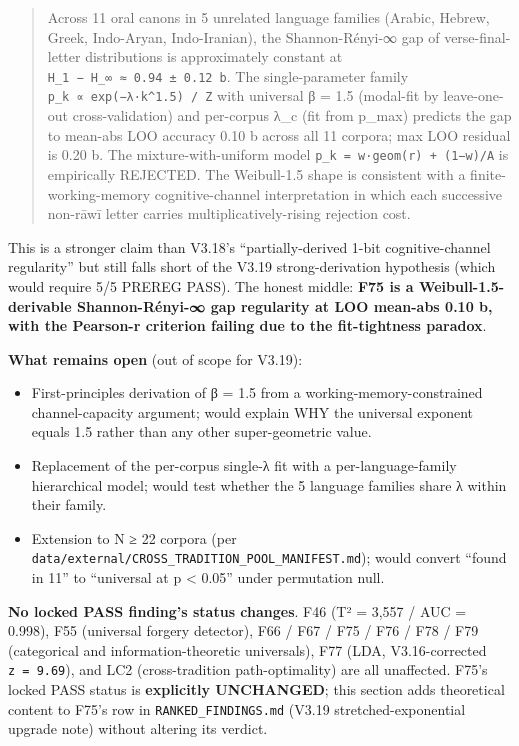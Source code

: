 \documentclass[
]{article}
\providecommand{\tightlist}{%
  \setlength{\itemsep}{0pt}\setlength{\parskip}{0pt}}
\begin{document}
\begin{quote}
Across 11 oral canons in 5 unrelated language families (Arabic, Hebrew,
Greek, Indo-Aryan, Indo-Iranian), the Shannon-Rényi-∞ gap of
verse-final-letter distributions is approximately constant at
\texttt{H\_1\ −\ H\_∞\ ≈\ 0.94\ ±\ 0.12\ b}. The single-parameter family
\texttt{p\_k\ ∝\ exp(−λ·k\^{}1.5)\ /\ Z} with universal β = 1.5
(modal-fit by leave-one-out cross-validation) and per-corpus λ\_c (fit
from p\_max) predicts the gap to mean-abs LOO accuracy 0.10 b across all
11 corpora; max LOO residual is 0.20 b. The mixture-with-uniform model
\texttt{p\_k\ =\ w·geom(r)\ +\ (1−w)/A} is empirically REJECTED. The
Weibull-1.5 shape is consistent with a finite-working-memory
cognitive-channel interpretation in which each successive non-rāwī
letter carries multiplicatively-rising rejection cost.
\end{quote}

This is a stronger claim than V3.18's ``partially-derived 1-bit
cognitive-channel regularity'' but still falls short of the V3.19
strong-derivation hypothesis (which would require 5/5 PREREG PASS). The
honest middle: \textbf{F75 is a Weibull-1.5-derivable Shannon-Rényi-∞
gap regularity at LOO mean-abs 0.10 b, with the Pearson-r criterion
failing due to the fit-tightness paradox}.

\textbf{What remains open} (out of scope for V3.19):

\begin{itemize}
\tightlist
\item
  First-principles derivation of β = 1.5 from a
  working-memory-constrained channel-capacity argument; would explain
  WHY the universal exponent equals 1.5 rather than any other
  super-geometric value.
\item
  Replacement of the per-corpus single-λ fit with a per-language-family
  hierarchical model; would test whether the 5 language families share λ
  within their family.
\item
  Extension to N ≥ 22 corpora (per
  \texttt{data/external/CROSS\_TRADITION\_POOL\_MANIFEST.md}); would
  convert ``found in 11'' to ``universal at p \textless{} 0.05'' under
  permutation null.
\end{itemize}

\textbf{No locked PASS finding's status changes}. F46 (T² = 3,557 / AUC
= 0.998), F55 (universal forgery detector), F66 / F67 / F75 / F76 / F78
/ F79 (categorical and information-theoretic universals), F77 (LDA,
V3.16-corrected \texttt{\textbar{}z\textbar{}\ =\ 9.69}), and LC2
(cross-tradition path-optimality) are all unaffected. F75's locked PASS
status is \textbf{explicitly UNCHANGED}; this section adds theoretical
content to F75's row in \texttt{RANKED\_FINDINGS.md} (V3.19
stretched-exponential upgrade note) without altering its verdict.
\end{document}
